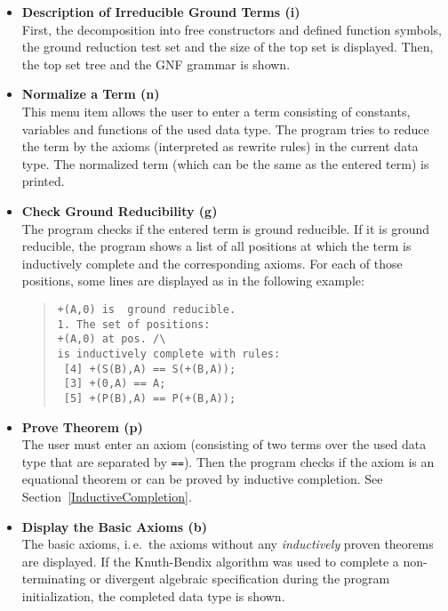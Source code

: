 \begin{itemize}
\item {\bf Description of Irreducible Ground Terms (i)}\\
First, the decomposition into free constructors and defined function
symbols, the ground reduction test set and the size of the top
set is displayed. Then, the top set tree and the GNF grammar is
shown.

\item {\bf Normalize a Term (n)}\\
This menu item allows the user to enter a term consisting of
constants, variables and functions of the used data type.
The program tries to reduce the term by the axioms (interpreted as
rewrite rules) in the current data type. The normalized term
(which can be the same as the entered term) is printed.

\item {\bf Check Ground Reducibility (g)}\\
The program checks if the entered term is ground reducible.
If it is ground reducible, the program shows a list of all positions
at which the term is inductively complete and the corresponding
axioms. For each of those positions, some lines are displayed as in the 
following example:
\begin{quote}
\begin{verbatim}
+(A,0) is  ground reducible.
1. The set of positions: 
+(A,0) at pos. /\
is inductively complete with rules: 
 [4] +(S(B),A) == S(+(B,A));
 [3] +(0,A) == A;
 [5] +(P(B),A) == P(+(B,A));
\end{verbatim}
\end{quote}

\item {\bf Prove Theorem (p)}\\
The user must enter an axiom (consisting of two terms over the used data
type that are separated by {\tt ==}). Then the program checks if
the axiom is an equational theorem or can be proved by inductive
completion. See Section~\ref{InductiveCompletion}.

\item {\bf Display the Basic Axioms (b)}\\
The basic axioms, i.\,e.\  the axioms without any {\em inductively} proven
theorems are displayed. If the Knuth-Bendix algorithm was used
to complete a non-terminating or divergent algebraic specification
during the program initialization, the completed data type is shown.


\end{itemize}
